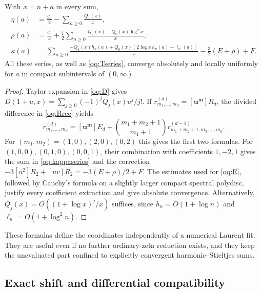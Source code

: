 \begin{theorem}\label{oq:series}
With $x=n+a$ in every sum,
\begin{align}
 \eta(a)&=\frac{g_2}{2}-\sum_{n\ge0}\frac{Q_1(x)}x,
 \label{oq:etaseries}\\
 \rho(a)&=\frac{g_3}{3}+
 \frac12\sum_{n\ge0}\frac{Q_2(x)-Q_0(x)\log^2x}{x},
 \label{oq:rhoseries}\\
 \kappa(a)&=\sum_{n\ge0}
 \frac{-Q_1(x)h_n(a)+Q_0(x)(2\log x\,h_n(a)-\ell_n(a))}{x}
 -\frac32(E+\rho)+F.\label{oq:kappaseries}
\end{align}
All these series, as well as \eqref{oq:Tseries}, converge absolutely
and locally uniformly for $a$ in compact subintervals of $(0,\infty)$.
\end{theorem}
\begin{proof}
Taylor expansion in \eqref{oq:D} gives
$D(1+u,x)=\sum_{j\ge0}(-1)^jQ_j(x)u^j/j!$.
If $r^{(d)}_{m_1,\ldots,m_d}=[\mathbf u^{\mathbf m}]R_d$, the
divided difference in \eqref{oq:Rrec} yields
\begin{equation}\label{oq:coeffrec}
 r^{(d)}_{m_1,\ldots,m_d}
 =[\mathbf u^{\mathbf m}]E_d+
 \binom{m_1+m_2+1}{m_1+1}
 r^{(d-1)}_{m_1+m_2+1,m_3,\ldots,m_d}.
\end{equation}
For $(m_1,m_2)=(1,0),(2,0),(0,2)$ this gives the first two formulas.
For $(1,0,0),(0,1,0),(0,0,1)$, their combination with coefficients
$1,-2,1$ gives the sum in \eqref{oq:kappaseries} and the correction
$-3[u^2]R_2+[uv]R_2=-3(E+\rho)/2+F$.
The estimates used for \eqref{oq:E}, followed by Cauchy's formula on
a slightly larger compact spectral polydisc, justify every coefficient
extraction and give absolute convergence. Alternatively,
$Q_j(x)=O((1+\log x)^j/x)$ suffices, since
$h_n=O(1+\log n)$ and $\ell_n=O(1+\log^2n)$.
\end{proof}

These formulas define the coordinates independently of a numerical
Laurent fit. They are useful even if no further ordinary-zeta reduction
exists, and they keep the unevaluated part confined to explicitly
convergent harmonic--Stieltjes sums.

\subsection{Exact shift and differential compatibility}

